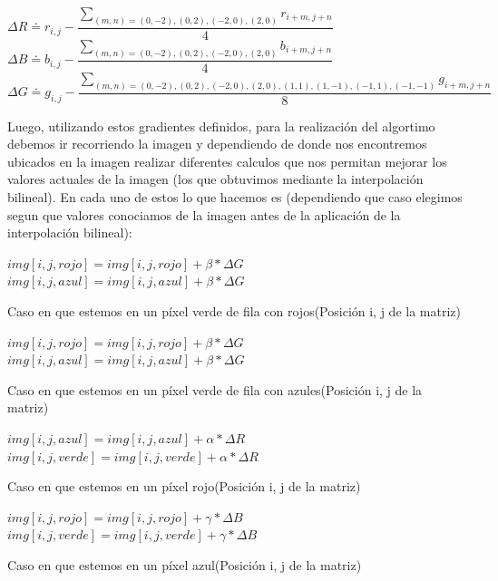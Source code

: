 \documentclass[10pt, a4paper]{article}
\begin{document}
\begin{center}
$\Delta R \doteq r_{i,j} - \dfrac{\sum_{(m,n)={(0,-2),(0,2),(-2,0),(2,0)}}r_{i+m,j+n}}{4}$\\
$\Delta B \doteq b_{i,j} - \dfrac{\sum_{(m,n)={(0,-2),(0,2),(-2,0),(2,0)}}b_{i+m,j+n}}{4}$\\
$\Delta G \doteq g_{i,j} - \dfrac{\sum_{(m,n)={(0,-2),(0,2),(-2,0),(2,0),(1,1),(1,-1), (-1,1), (-1,-1)}}g_{i+m,j+n}}{8}$\\
\end{center}

Luego, utilizando estos gradientes definidos, para la realizaci\'on del algortimo debemos ir recorriendo la imagen y dependiendo de donde nos encontremos ubicados en la imagen realizar diferentes calculos que nos permitan mejorar los valores actuales de la imagen (los que obtuvimos mediante la interpolaci\'on bilineal). En cada uno de estos lo que hacemos es (dependiendo que caso elegimos segun que valores conociamos de la imagen antes de la aplicaci\'on de la interpolaci\'on bilineal):

\begin{algorithm}[H]
$img[i,j,rojo]=img[i,j,rojo]+\beta*\Delta G$\;
$img[i,j,azul]=img[i,j,azul]+\beta*\Delta G$\;
\caption{Caso en que estemos en un p\'ixel verde de fila con rojos(Posici\'on i, j de la matriz)}
\end{algorithm} 

\begin{algorithm}[H]
$img[i,j,rojo]=img[i,j,rojo]+\beta*\Delta G$\;
$img[i,j,azul]=img[i,j,azul]+\beta*\Delta G$\;
\caption{Caso en que estemos en un p\'ixel verde de fila con azules(Posici\'on i, j de la matriz)}
\end{algorithm} 

\begin{algorithm}[H]
$img[i,j,azul]=img[i,j,azul]+\alpha*\Delta R$\;
$img[i,j,verde]=img[i,j,verde]+\alpha*\Delta R$\;
\caption{Caso en que estemos en un p\'ixel rojo(Posici\'on i, j de la matriz)}
\end{algorithm} 

\begin{algorithm}[H]
$img[i,j,rojo]=img[i,j,rojo]+\gamma*\Delta B$\;
$img[i,j,verde]=img[i,j,verde]+\gamma*\Delta B$\;
\caption{Caso en que estemos en un p\'ixel azul(Posici\'on i, j de la matriz)}
\end{algorithm}
\end{document}
